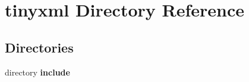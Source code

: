 \section{tinyxml Directory Reference}
\label{dir_18d3087aed30122f9d23c90268fbd882}
\subsection*{Directories}
\begin{DoxyCompactItemize}
\item 
directory \textbf{ include}
\end{DoxyCompactItemize}
